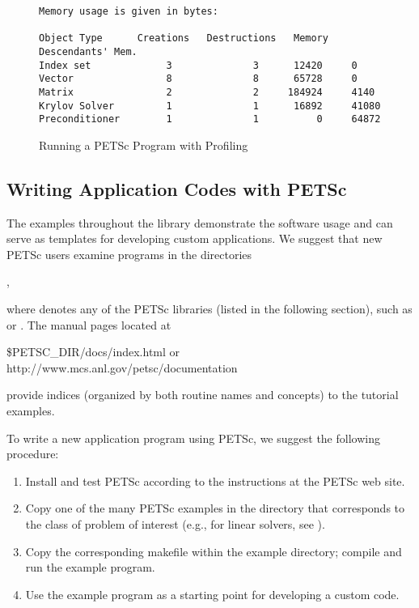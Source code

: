 \begin{figure}[H]
{\begin{verbatim}
Memory usage is given in bytes:

Object Type      Creations   Destructions   Memory  Descendants' Mem.
Index set             3              3      12420     0
Vector                8              8      65728     0
Matrix                2              2     184924     4140
Krylov Solver         1              1      16892     41080
Preconditioner        1              1          0     64872

\end{verbatim}
}
\nobreak
\caption{Running a PETSc Program with Profiling}
\label{fig_exprof}
\end{figure}

\subsection*{Writing Application Codes with PETSc}

The examples throughout the library demonstrate the software usage
and can serve as templates for developing
custom applications.  We suggest that new PETSc
users examine programs in the directories
\begin{tabbing}
  ,
\end{tabbing}
where 
denotes any of the PETSc libraries (listed in the following
section), such as  or .
The manual pages located at
\begin{tabbing}
   \${PETSC\_DIR}/docs/index.html or \\
   http://www.mcs.anl.gov/petsc/documentation
\end{tabbing}
provide indices (organized by both routine names and concepts) to the tutorial examples.

To write a new application program using PETSc, we suggest the
following procedure:
\begin{enumerate}
\item Install and test PETSc according to the instructions at the PETSc web site.
\item Copy one of the many PETSc examples in the directory
      that corresponds to the class of problem of interest (e.g.,
      for linear solvers, see ).
\item Copy the corresponding makefile within the example directory;
      compile and run the example program.
\item Use the example program as a starting point for developing a custom code.
\end{enumerate}

